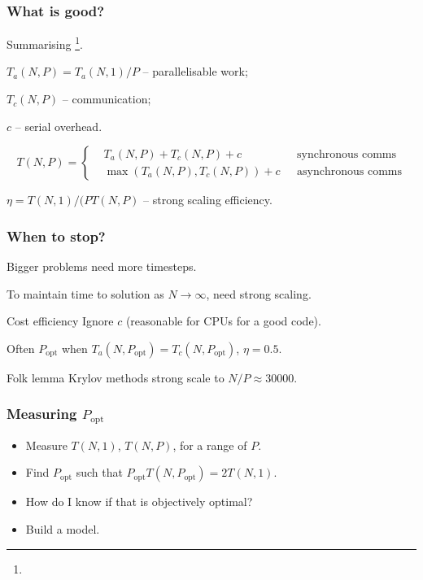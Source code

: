 \documentclass[presentation]{beamer}
\begin{document}
\begin{frame}
  \frametitle{What is good?}

  Summarising \textcite{Fischer:2015}\footnote{}.
  
  \begin{block}{}

    $T_a(N, P) = T_a(N, 1)/P$ -- parallelisable work;

    $T_c(N, P)$ -- communication;

    $c$ -- serial overhead.

    \begin{equation*}
      T(N, P) = \left\{
        \begin{split}
          &T_a(N, P) + T_c(N, P) + c &\text{ synchronous comms}\\
          &\max(T_a(N, P), T_c(N, P)) + c\,\,&\text{ asynchronous comms}
        \end{split}\right.
    \end{equation*}

    $\eta = T(N, 1)/(PT(N,P)$ -- strong scaling efficiency.
  \end{block}
\end{frame}

\begin{frame}
  \frametitle{When to stop?}

  Bigger problems need more timesteps.
  
  To maintain time to solution as $N\rightarrow \infty$, need strong
  scaling.

  \begin{block}{Cost efficiency}
    Ignore $c$ (reasonable for CPUs for a good code).

    Often $P_{\text{opt}}$ when $T_a(N, P_\text{opt}) = T_c(N,
    P_\text{opt})$, $\eta = 0.5$.
  \end{block}

  \begin{block}{Folk lemma}
    Krylov methods strong scale to $N/P \approx 30000$.
  \end{block}
\end{frame}

\begin{frame}
  \frametitle{Measuring $P_{\text{opt}}$}
  
  \begin{itemize}
  \item Measure $T(N, 1)$, $T(N, P)$, for a range of $P$.

  \item Find $P_\text{opt}$ such that
    $P_\text{opt}T(N, P_\text{opt}) = 2T(N,1)$.

  \item How do I know if that is objectively optimal?

  \item<2>{Build a model.}
  \end{itemize}
\end{frame}
\end{document}
